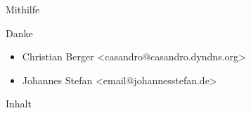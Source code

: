 \documentclass[12pt,hyperref={pdfpagelabels=false},notes=show]{beamer}
\begin{document}

\begin{frame}{Mithilfe}
    \begin{block}{Danke}
        \begin{itemize}
            \item Christian Berger \textless{}casandro@casandro.dyndns.org\textgreater{}
            \item Johannes Stefan \textless{}email@johannesstefan.de\textgreater{}
        \end{itemize}
    \end{block}
\end{frame}

\begin{frame}{Inhalt}
    \hspace{0.1\textwidth}
    \parbox[c][0.8\textheight][s]{0.8\textwidth}{
        \tableofcontents
    }
\end{frame}
\end{document}
